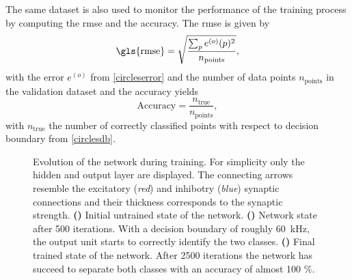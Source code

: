 The same dataset is also used to monitor the performance of the training process by computing the \gls{rmse} and the accuracy. The \gls{rmse} is given by
\begin{equation}
\text{\gls{rmse}} = \sqrt{\frac{\sum_p e^{(o)}(p)^2}{n_\text{points}}},
\end{equation}
with the error $e^{(o)}$ from \cref{circleserror} and the number of data points $n_\text{points}$ in the validation dataset and the accuracy yields
\begin{equation}
\text{Accuracy} = \frac{n_\text{true}}{n_\text{points}},
\end{equation}
with $n_\text{true}$ the number of correctly classified points with respect to decision boundary from \cref{circlesdb}.

%	

\begin{figure}[t!]
	\begin{subfigure}{\textwidth}
		\caption{}
		\vspace{-0.1in}
		\centering
		
		\label{learning_process_s5}
		\vspace{-.5in}
	\end{subfigure}
	\begin{subfigure}{\textwidth}
		\caption{}
		\vspace{-0.1in}
		\centering
		
		\label{learning_process_s500}
		\vspace{-.5in}
	\end{subfigure}
	\begin{subfigure}{\textwidth}
		\caption{}
		\vspace{-0.1in}
		\centering
		
		\label{learning_process_s2500}
	\end{subfigure}
	\vspace{-.4in}
	\caption[Evolution of the network during training.]{Evolution of the network during training. For simplicity only the hidden and output layer are displayed. The connecting arrows resemble the excitatory (\emph{red}) and inhibotry (\emph{blue}) synaptic connections and their thickness corresponds to the synaptic strength. \textbf{()} Initial untrained state of the network. \textbf{()} Network state after 500 iterations. With a decision boundary of roughly \SI{60}{\kilo \Hz}, the output unit starts to correctly identify the two classes. \textbf{()} Final trained state of the network. After 2500 iterations the network has succeed to separate both classes with an accuracy of almost 100 \%.}
\end{figure}

